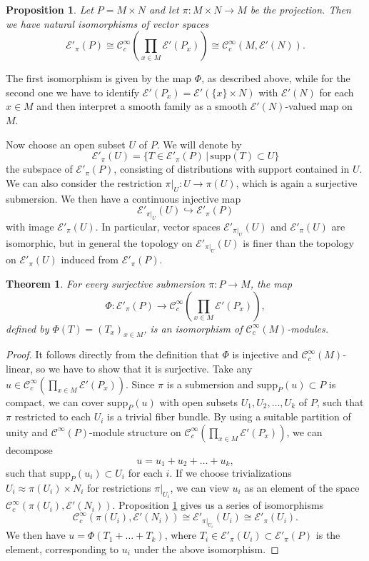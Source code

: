 \documentclass[a4paper]{amsart}
\newtheorem{prop}[dfn]{Proposition}
\newtheorem{theo}[dfn]{Theorem}
\newcommand{\cE}{\mathcal{E}}
\newcommand{\supp}{\mathord{\mathrm{supp}}}
\newcommand{\C}{\mathord{\mathcal{C}^{\infty}}}
\newcommand{\Cc}{\mathord{\mathcal{C}^{\infty}_{c}}}
\begin{document}
\begin{prop}\label{Isomorphism Phi for trivial bundles}
Let $P=M\times N$ and let $\pi:M\times N\to M$ be the projection. Then we have natural isomorphisms of vector spaces
\[
\cE'_{\pi}(P)\cong\Cc(\prod_{x\in M}\cE'(P_{x}))\cong\Cc(M,\cE'(N)).
\]
\end{prop}
The first isomorphism is given by the map $\Phi$, as described above, while for the second one we have to identify $\cE'(P_{x})=\cE'(\{x\}\times N)$
with $\cE'(N)$ for each $x\in M$ and then interpret a smooth family as a smooth $\cE'(N)$-valued map on $M$.

Now choose an open subset $U$ of $P$. We will denote by 
\[
\cE'_{\pi}(U)=\{T\in\cE'_{\pi}(P)\,|\,\supp(T)\subset U\}
\]
the subspace of $\cE'_{\pi}(P)$, consisting of distributions with support contained in $U$. We can also consider the restriction $\pi|_{U}:U\to\pi(U)$,
which is again a surjective submersion. We then have a continuous injective map 
\[
\cE'_{\pi|_{U}}(U)\hookrightarrow\cE'_{\pi}(P)
\]
with image $\cE'_{\pi}(U)$. In 
particular, vector spaces $\cE'_{\pi|_{U}}(U)$ and $\cE'_{\pi}(U)$ are isomorphic, but in general the topology on 
$\cE'_{\pi|_{U}}(U)$ is finer than the topology on $\cE'_{\pi}(U)$ induced from $\cE'_{\pi}(P)$.

\begin{theo}
For every surjective submersion $\pi:P\to M$, the map 
\[
\Phi:\cE'_{\pi}(P)\to\Cc(\prod_{x\in M}\cE'(P_{x})),
\]
defined by $\Phi(T)=(T_{x})_{x\in M}$, is an isomorphism of $\Cc(M)$-modules. 
\end{theo}
\begin{proof}
It follows directly from the definition that $\Phi$ is injective and $\Cc(M)$-linear, so we have to show that
it is surjective. Take any $u\in\Cc(\prod_{x\in M}\cE'(P_{x}))$. Since $\pi$ is a submersion and $\supp_{P}(u)\subset P$ is compact, we can cover $\supp_{P}(u)$ 
with open subsets $U_{1},U_{2},\ldots,U_{k}$ of $P$, such that $\pi$ restricted to each $U_{i}$ is a trivial fiber bundle. By using a suitable
partition of unity and $\C(P)$-module structure on $\Cc(\prod_{x\in M}\cE'(P_{x}))$, we can decompose 
\[
u=u_{1}+u_{2}+\ldots+u_{k},
\]
such that $\supp_{P}(u_{i})\subset U_{i}$ for each $i$. 
If we choose trivializations $U_{i}\approx \pi(U_{i})\times N_{i}$ for restrictions $\pi|_{U_{i}}$,
we can view $u_{i}$ as an element
of the space $\Cc(\pi(U_{i}),\cE'(N_{i}))$. Proposition \ref{Isomorphism Phi for trivial bundles} gives us a series of isomorphisms
\[
\Cc(\pi(U_{i}),\cE'(N_{i}))\cong\cE'_{\pi|_{U_{i}}}(U_{i})\cong\cE'_{\pi}(U_{i}).
\]
We then have $u=\Phi(T_{1}+\ldots+T_{k})$, where $T_{i}\in\cE'_{\pi}(U_{i})\subset\cE'_{\pi}(P)$ is the element, 
corresponding to $u_{i}$ under the above isomorphism.
\end{proof}
\end{document}
